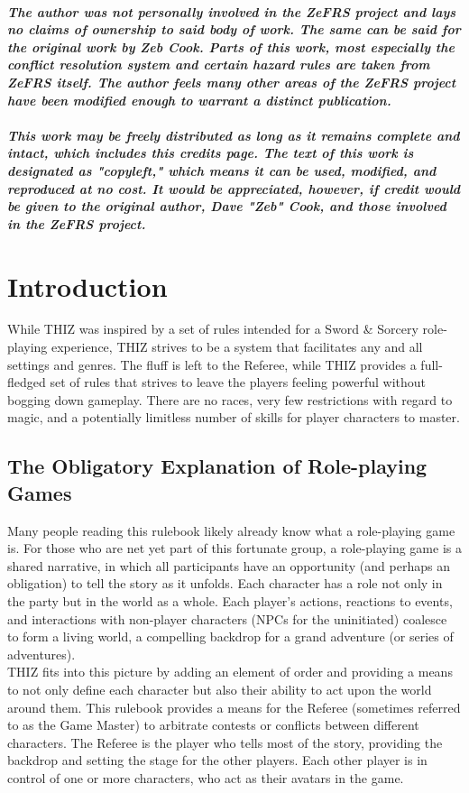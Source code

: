 \documentclass[oneside]{book}
\begin{document}
\paragraph{The author was not personally involved in the ZeFRS project and lays no claims of ownership to said body of work. The same can be said for the original work by Zeb Cook. Parts of this work, most especially the conflict resolution system and certain hazard rules are taken from ZeFRS itself. The author feels many other areas of the ZeFRS project have been modified enough to warrant a distinct publication. \\ \\
This work may be freely distributed as long as it remains complete and intact, which includes this credits page. The text of this work is designated as "copyleft," which means it can be used, modified, and reproduced at no cost. It would be appreciated, however, if credit would be given to the original author, Dave "Zeb" Cook, and those involved in the ZeFRS project.}

\tableofcontents

\chapter{Introduction}

While THIZ was inspired by a set of rules intended for a Sword \& Sorcery role-playing experience, THIZ strives to be a system that facilitates any and all settings and genres. The fluff is left to the Referee, while THIZ provides a full-fledged set of rules that strives to leave the players feeling powerful without bogging down gameplay. There are no races, very few restrictions with regard to magic, and a potentially limitless number of skills for player characters to master. 

\section*{The Obligatory Explanation of Role-playing Games}

Many people reading this rulebook likely already know what a role-playing game is. For those who are net yet part of this fortunate group, a role-playing game is a shared narrative, in which all participants have an opportunity (and perhaps an obligation) to tell the story as it unfolds. Each character has a role not only in the party but in 
the world as a whole. Each player's actions, reactions to events, and interactions with non-player characters (NPCs for the uninitiated) coalesce to form a living world, a compelling backdrop for a grand adventure (or series of adventures). \\
THIZ fits into this picture by adding an element of order and providing a means to not only define each character but also their ability to act upon the world around them. This rulebook provides a means for the Referee (sometimes referred to as the Game Master) to arbitrate contests or conflicts between different characters. The Referee is the player who tells most of the story, providing the backdrop and setting the stage for the other players. Each other player is in control of one or more characters, who act as their avatars in the game. 
\end{document}
